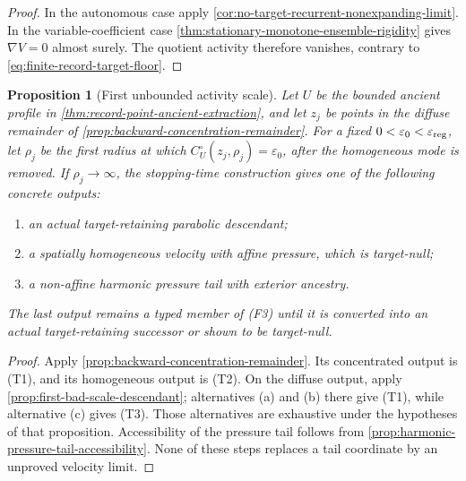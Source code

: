 \documentclass[11pt]{amsart}
\numberwithin{equation}{section}
\theoremstyle{plain}
\newtheorem{proposition}[proposition]{Proposition}
\theoremstyle{definition}
\theoremstyle{remark}
\begin{document}
\begin{proof}
In the autonomous case apply
\cref{cor:no-target-recurrent-nonexpanding-limit}.  In the variable-coefficient
case \cref{thm:stationary-monotone-ensemble-rigidity} gives
\(\nabla V=0\) almost surely.  The quotient activity therefore vanishes,
contrary to \eqref{eq:finite-record-target-floor}.
\end{proof}

\begin{proposition}[First unbounded activity scale]
\label{prop:first-unbounded-activity-scale}
Let \(U\) be the bounded ancient profile in
\cref{thm:record-point-ancient-extraction}, and let \(z_j\) be points in the
diffuse remainder of
\cref{prop:backward-concentration-remainder}.  For a fixed
\(0<\varepsilon_0<\varepsilon_{\rm reg}\), let \(\rho_j\) be the first radius
at which
\(C_U^\circ(z_j,\rho_j)=\varepsilon_0\), after the homogeneous mode is
removed.  If \(\rho_j\to\infty\), the stopping-time construction gives one
of the following concrete outputs:
\begin{enumerate}[label=\textup{(T\arabic*)},leftmargin=2.8em]
\item an actual target-retaining parabolic descendant;
\item a spatially homogeneous velocity with affine pressure, which is
target-null;
\item a non-affine harmonic pressure tail with exterior ancestry.
\end{enumerate}
The last output remains a typed member of \textup{(F3)} until it is
converted into an actual target-retaining successor or shown to be
target-null.
\end{proposition}

\begin{proof}
Apply \cref{prop:backward-concentration-remainder}.  Its concentrated output
is \textup{(T1)}, and its homogeneous output is \textup{(T2)}.  On the
diffuse output, apply \cref{prop:first-bad-scale-descendant}; alternatives
\textup{(a)} and \textup{(b)} there give \textup{(T1)}, while alternative
\textup{(c)} gives \textup{(T3)}.  Those alternatives are exhaustive under
the hypotheses of that proposition.  Accessibility of the pressure tail follows from
\cref{prop:harmonic-pressure-tail-accessibility}.  None of these steps
replaces a tail coordinate by an unproved velocity limit.
\end{proof}
\end{document}
